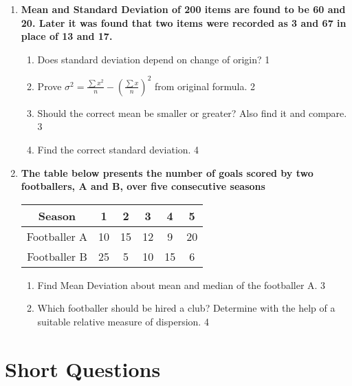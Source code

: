 \documentclass[a4paper,oneside]{book}
\begin{document}
\begin{enumerate}
 \item
	  \textbf{Mean and Standard Deviation of 200 items are found to be 60 and 20. Later it was found that two items were recorded as 3 and 67 in place of 13 and 17.} 
  
  \begin{enumerate}
    \item
	Does standard deviation depend on change of origin? \hfill 1
    \item
	Prove $\displaystyle \sigma^2 = \frac{\sum x^2}n -(\frac{\sum x}{n})^2$ from original formula. \hfill 2
    \item  
	Should the correct mean be smaller or greater? Also find it and compare.  \hfill 3
    \item
	Find the correct standard deviation. \hfill 4
  \end{enumerate}
      \item
  \textbf{The table below presents the number of goals scored by two footballers, A and B, over five consecutive seasons}

 \begin{table}[h]
\centering
\begin{tabular}{c|c|c|c|c|c}
Season      & 1  & 2  & 3  & 4  & 5  \\ \hline
Footballer A & 10 & 15 & 12 & 9  & 20 \\ \hline
Footballer B & 25 & 5  & 10 & 15 & 6  
\end{tabular}
\end{table}

  \begin{enumerate}
    \item  
	Find Mean Deviation about mean and median of the footballer A.  \hfill 3
    \item
	Which footballer should be hired a club? Determine with the help of a suitable relative measure of dispersion. \hfill 4
\end{enumerate}

\end{enumerate}

\section{Short Questions}
\end{document}
